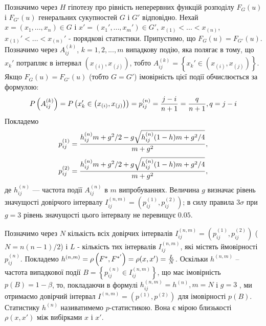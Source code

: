 \documentclass[14pt,a4paper,titlepage]{extarticle}
\begin{document}
Позначимо через $H$ гіпотезу про рівність неперервних функцій
розподілу  $F_G(u)$ і $F_{G'}(u)$ генеральних сукупностей $G$ і $G'$ відповідно.
Нехай $x=(x_1,...,x_n)\in G$ і $x'=(x_1',...,x_m')\in G'$, $x_{(1)}<...<x_{(n)}$, $x_{(1)}'<...<x_{(n)}'$ - порядкові статистики.
Припустимо, що $F_G(u) = F_{G'}(u)$. Позначимо через $A_{ij}^{(k)}$, $k=1,2,..., m$
випадкову подію, яка полягає в тому, що $x_k'$ потрапляє в інтервал  $\left(x_{(i)},x_{(j)}\right)$,
тобто $A_{ij}^{(k)} = \left\{x_k' \in \left(x_{(i)}, x_{(j)}\right)\right\}$. Якщо $F_G(u) = F_{G'}(u)$ (тобто $G = G'$) імовірність
цієї події обчислюється за формулою:
\[P\left(A_{ij}^{(k)}\right) = P\left(x_k' \in \left(x_{(i)}, x_{(j)}\right)\right) = p_{ij}^{(n)} = {{j-i}\over{n+1}} = {{q}\over{n+1}}, q = j-i\]
Покладемо
\begin{equation}\label{eq:p1}
p_{ij}^{(1)} = {{h_{ij}^{(n)}m+g^2/2-g\sqrt{h_{ij}^{(n)}(1-h)m+g^2/4}}\over{m+g^2}},
\end{equation}
\begin{equation}\label{eq:p2}
p_{ij}^{(2)} = {{h_{ij}^{(n)}m+g^2/2+g\sqrt{h_{ij}^{(n)}(1-h)m+g^2/4}}\over{m+g^2}},
\end{equation}
де $h_{ij}^{(n)}$ — частота події $A_{ij}^{(n)}$
в $m$ випробуваннях. Величина $g$ визначає
рівень значущості довірчого інтервалу $I_{ij}^{(n,m)} = \left(p_{ij}^{(1)},p_{ij}^{(2)}\right)$; в силу правила $3\sigma$
при $g=3$ рівень значущості цього інтервалу не перевищує $0.05$.
\par
Позначимо через $N$ кількість всіх довірчих інтервалів
$I_{ij}^{(n,m)} = \left(p_{ij}^{(1)},p_{ij}^{(2)}\right)$ ($N=n(n-1)/2$) і $L$ -
кількість тих інтервалів $I_{ij}^{(n,m)}$, які містять ймовірності $p_{ij}^{(n)}$. Покладемо $h^{(n,m)}=\rho \left(F^{*},{F^{*'}}\right) = \rho(x,x') = {L\over{N}}$.
Оскільки $h^{(n,m)}$ –
частота випадкової події $B=\left\{p_{ij}^{(n)} \in I_{ij}^{(n,m)}\right\}$, що має імовірність $p(B)=1-\beta$,
то, покладаючи в формулі $h_{ij}^{(n,m)} = h^{(n)}, m = N$ і $g=3$ , ми отримаємо
довірчий інтервал $I^{(n,m)} = \left(p^{(1)},p^{(2)}\right)$ для імовірності
$p(B)$. Статистику $h^{(n)}$
називатимемо $p$-статистикою. Вона є мірою близькості  $\rho(x,x')$ між вибірками
$x$ і $x'$.
\end{document}
